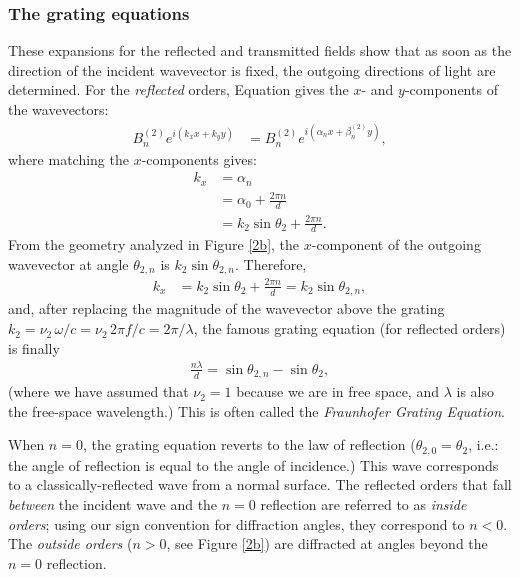 \subsubsection{The grating equations}
These expansions for the reflected and transmitted fields show that as soon as the direction of the incident wavevector is fixed, the outgoing directions of light are determined.  For the \emph{reflected} orders, Equation  gives the $x$- and $y$-components of the wavevectors:
\begin{align}
B^{(2)}_n e^{i(k_x x + k_y y)} &= B^{(2)}_n e^{i(\alpha_n x + \beta^{(2)}_n y)},
\end{align}
where matching the $x$-components gives:
\begin{align}
k_x &= \alpha_n \\
  &= \alpha_0 + \frac{ 2\pi n}{d} \\
  &= k_2 \sin \theta_2 +\frac{ 2\pi n}{d}.
\end{align}
From the geometry analyzed in Figure \ref{2b}, the $x$-component of the outgoing wavevector at angle $\theta_{2,n}$ is $k_2 \sin \theta_{2,n}$.  Therefore,
\begin{align}
\label{kxEqn2}
k_x &= k_2 \sin \theta_2 +\frac{ 2\pi n}{d} = k_2 \sin \theta_{2,n},
\end{align}
and, after replacing the magnitude of the wavevector above the grating $k_2 = \nu_2\, \omega / c = \nu_2 \, 2\pi f / c =  2\pi / \lambda$, the famous grating equation (for reflected orders) is finally
\begin{align}
\label{gratingEquation}
\frac{n \lambda}{d} = \sin \theta_{2,n} -  \sin \theta_{2},
\end{align}
(where we have assumed that $\nu_2 = 1$ because we are in free space, and $\lambda$ is also the free-space wavelength.) This is often called the \emph{Fraunhofer Grating Equation}.

When $n=0$, the grating equation reverts to the law of reflection ($\theta_{2,0} = \theta_2$, i.e.: the angle of reflection is equal to the angle of incidence.)  This wave corresponds to a classically-reflected wave from a normal surface.  The reflected orders that fall \emph{between} the incident wave and the $n=0$ reflection are referred to as \emph{inside orders}; using our sign convention for diffraction angles, they correspond to $n<0$.  The \emph{outside orders} ($n>0$, see Figure \ref{2b}) are diffracted at angles beyond the $n=0$ reflection.

